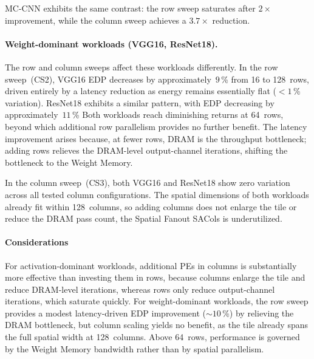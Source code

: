 MC-CNN exhibits the same contrast: the row sweep saturates after
$2\times$ improvement, while the column
sweep achieves a $3.7\times$ reduction.


\paragraph{Weight-dominant workloads (VGG16, ResNet18).}
The row and column sweeps affect these workloads differently.
In the row sweep~(CS2), VGG16 EDP decreases by approximately~$9$\,\%
from 16 to 128~rows, driven entirely by a latency reduction as energy remains
essentially flat ($< 1$\,\% variation).
ResNet18 exhibits a similar pattern, with EDP decreasing by
approximately~$11$\,\%
Both workloads reach diminishing returns at 64~rows, beyond which
additional row parallelism provides no further benefit.
The latency improvement arises because, at fewer rows, DRAM
is the throughput bottleneck; adding rows relieves the DRAM-level
output-channel iterations, shifting the bottleneck to the Weight Memory.

In the column sweep~(CS3), both VGG16 and ResNet18 show
zero variation across all tested column configurations.
The spatial dimensions of both workloads already fit within
128~columns, so adding columns does not enlarge the tile or
reduce the DRAM pass count, the Spatial Fanout SACols is underutilized.

\paragraph{Considerations}
For activation-dominant workloads, additional PEs in columns
is substantially more effective than investing them in rows, because
columns enlarge the tile and reduce DRAM-level iterations, whereas
rows only reduce output-channel iterations, which saturate quickly.
For weight-dominant workloads, the row sweep provides a modest
latency-driven EDP improvement (${\sim}10$\,\%) by relieving the
DRAM bottleneck, but column scaling yields no benefit, as
the tile already spans the full spatial width at 128~columns.
Above 64~rows, performance is governed by the Weight Memory
bandwidth rather than by spatial parallelism.